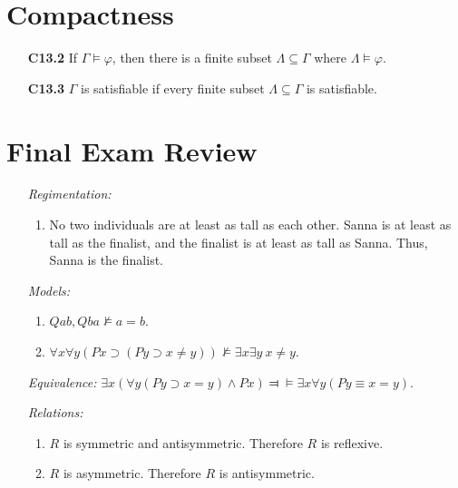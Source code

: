 \documentclass[a4paper, 11pt]{article} %
\newcommand{\qt}[2]{#1 #2} %
\renewcommand{\models}{\vDash}
\def\metaA{\ensuremath{\varphi}}
\begin{document}
\section*{Compactness}

\begin{itemize}
  \item[\bf C13.2] If $\Gamma\models\metaA$, then there is a finite subset $\Lambda\subseteq\Gamma$ where $\Lambda\models\metaA$.
  \item[\bf C13.3] $\Gamma$ is satisfiable if every finite subset $\Lambda\subseteq\Gamma$ is satisfiable.
\end{itemize}



\section*{Final Exam Review}

\begin{enumerate}
  \item[\it Regimentation:]
    \begin{enumerate}
      \item No two individuals are at least as tall as each other. Sanna is at least as tall as the finalist, and the finalist is at least as tall as Sanna. Thus, Sanna is the finalist.
    \end{enumerate}
  \item[\it Models:]
    \begin{enumerate}
      \item $Qab, Qba \nvDash a=b$.
      \item $\qt{\forall}{x}\qt{\forall}{y}(Px \supset (Py \supset x \neq y)) \nvDash \qt{\exists}{x}\qt{\exists}{y}\ x \neq y$.
    \end{enumerate}
  \item[\it Equivalence:] $\qt{\exists}{x}(\qt{\forall}{y}(Py \supset x = y) \wedge Px) \Dashv\vDash \qt{\exists}{x}\qt{\forall}{y}(Py \equiv x = y)$.
  \item[\it Relations:]
    \begin{enumerate}
      \item $R$ is symmetric and antisymmetric. Therefore $R$ is reflexive.
      \item $R$ is asymmetric. Therefore $R$ is antisymmetric.
    \end{enumerate}
\end{enumerate}
\end{document}
